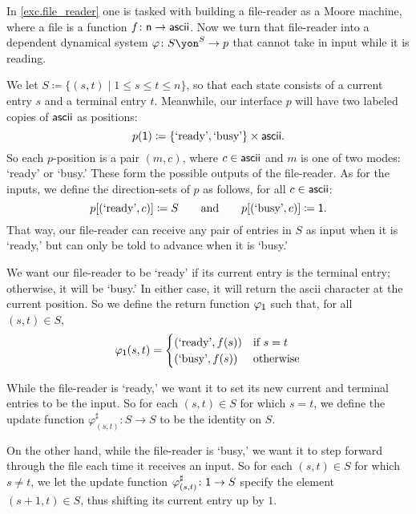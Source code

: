 \documentclass[Book-Poly]{subfiles}
\begin{document}
\begin{example}\label{ex.generalized_file_reader}
In \cref{exc.file_reader} one is tasked with building a file-reader as a Moore machine, where a file is a function $f\colon\mathsf{n}\to\mathsf{ascii}$.
Now we turn that file-reader into a dependent dynamical system $\varphi\colon S\yon^S\to p$ that cannot take in input while it is reading.

We let $S \coloneqq \{(s,t)\mid 1\leq s\leq t\leq n\}$, so that each state consists of a current entry $s$ and a terminal entry $t$.
Meanwhile, our interface $p$ will have two labeled copies of $\mathsf{ascii}$ as positions:
\[
    p(\textsf{1})\coloneqq\{\text{`ready'}, \text{`busy'}\}\times\mathsf{ascii}.
\]
So each $p$-position is a pair $(m,c)$, where $c\in\mathsf{ascii}$ and $m$ is one of two modes: `ready' or `busy.'
These form the possible outputs of the file-reader.
As for the inputs, we define the direction-sets of $p$ as follows, for all $c\in\mathsf{ascii}$:
\[
    p[(\text{`ready'}, c)]\coloneqq S \qquad\text{and}\qquad p[(\text{`busy'}, c)]\coloneqq\textsf{1}.
\]
That way, our file-reader can receive any pair of entries in $S$ as input when it is `ready,' but can only be told to advance when it is `busy.'

We want our file-reader to be `ready' if its current entry is the terminal entry; otherwise, it will be `busy.'
In either case, it will return the ascii character at the current position.
So we define the return function $\varphi_{\textsf{1}}$ such that, for all $(s,t)\in S$,
\begin{align*}
  \varphi_{\textsf{1}}(s, t) =
  \begin{cases}
    (\text{`ready'}, f(s)) &\mbox{if $s = t$}\\
    (\text{`busy'}, f(s)) &\mbox{otherwise}
  \end{cases}
\end{align*}

While the file-reader is `ready,' we want it to set its new current and terminal entries to be the input.
So for each $(s,t)\in S$ for which $s=t$, we define the update function $\varphi^\sharp_{(s,t)}\colon S\to S$ to be the identity on $S$.

On the other hand, while the file-reader is `busy,' we want it to step forward through the file each time it receives an input.
So for each $(s,t)\in S$ for which $s\neq t$, we let the update function $\varphi^\sharp_{(s,t)}\colon \textsf{1}\to S$ specify the element $(s+1, t)\in S$, thus shifting its current entry up by $1$.
\end{example}
\end{document}
